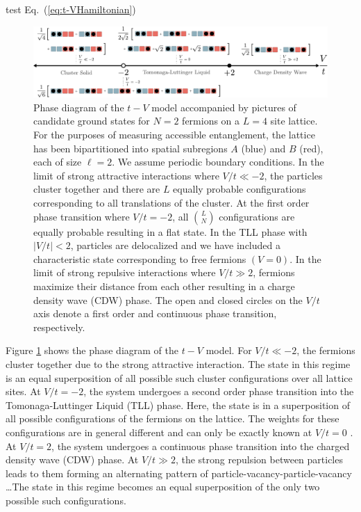 test Eq.~(\ref{eq:t-VHamiltonian})

\begin{figure}[thp]
\begin{center}
\includegraphics[width=1.0\textwidth]{phaseDiagramtV.pdf}
\end{center}
\caption{Phase diagram of the $t-V$ model accompanied by pictures of candidate ground states for $N=2$ fermions on a $L=4$ site lattice. For the purposes of measuring accessible entanglement, the lattice has been bipartitioned into spatial subregions $A$ (blue) and $B$ (red), each of size $\ell = 2$. We assume periodic boundary conditions. In the limit of strong attractive interactions where $V/t \ll -2$, the particles cluster together and there are $L$ equally probable configurations corresponding to all translations of the cluster.  At the first order phase transition where $V/t = -2$, all ${L}\choose{N}$ configurations are equally probable resulting in a flat state. In the TLL phase with $|V/t| < 2$,  particles are delocalized and we have included a characteristic state corresponding to free fermions $(V=0)$. In the limit of strong repulsive interactions where $V/t \gg 2$, fermions maximize their distance from each other resulting in a charge density wave (CDW) phase. The open and closed circles on the $V/t$ axis denote a first order and continuous phase transition, respectively.}
\label{fig:phaseDiagram}
\end{figure}

Figure \ref{fig:phaseDiagram} shows the phase diagram of the $t-V$ model. For $V/t \ll -2$, the fermions cluster together due to the strong attractive interaction. The state in this regime is an equal superposition of all possible such cluster configurations over all lattice sites. At $V/t = -2$, the system undergoes a second order phase transition into the Tomonaga-Luttinger Liquid (TLL) phase. Here, the state is in a superposition of all possible configurations of the fermions on the lattice. The weights for these configurations are in general different and can only be exactly known at $V/t = 0$ \cite{PhysRevLett.121.150501}. At $V/t = 2$, the system undergoes a continuous phase transition into the charged density wave (CDW) phase. At $V/t \gg 2$, the strong repulsion between particles leads to them forming an alternating pattern of particle-vacancy-particle-vacancy \dots The state in this regime becomes an equal superposition of the only two possible such configurations.

